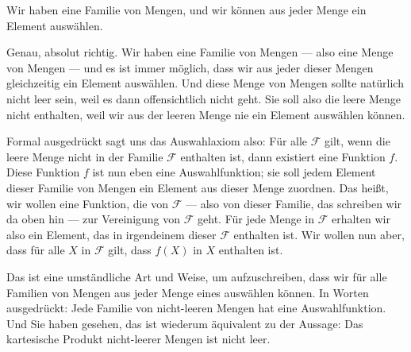 \begin{student-interaction}[Studentenantwort]
Wir haben eine Familie von Mengen, und wir können aus jeder Menge ein Element auswählen.
\end{student-interaction}

\begin{spoken-clean}[00:01:05 - 00:02:40]
Genau, absolut richtig. Wir haben eine Familie von Mengen --- also eine Menge von Mengen --- und es ist immer möglich, dass wir aus jeder dieser Mengen gleichzeitig ein Element auswählen. Und diese Menge von Mengen sollte natürlich nicht leer sein, weil es dann offensichtlich nicht geht. Sie soll also die leere Menge nicht enthalten, weil wir aus der leeren Menge nie ein Element auswählen können.

Formal ausgedrückt sagt uns das Auswahlaxiom also: Für alle $\mathcal{F}$ gilt, wenn die leere Menge nicht in der Familie $\mathcal{F}$ enthalten ist, dann existiert eine Funktion $f$. Diese Funktion $f$ ist nun eben eine Auswahlfunktion; sie soll jedem Element dieser Familie von Mengen ein Element aus dieser Menge zuordnen. Das heißt, wir wollen eine Funktion, die von $\mathcal{F}$ --- also von dieser Familie, das schreiben wir da oben hin --- zur Vereinigung von $\mathcal{F}$ geht. Für jede Menge in $\mathcal{F}$ erhalten wir also ein Element, das in irgendeinem dieser $\mathcal{F}$ enthalten ist. Wir wollen nun aber, dass für alle $X$ in $\mathcal{F}$ gilt, dass $f(X)$ in $X$ enthalten ist.
\end{spoken-clean}

\begin{math-stroke}
\end{math-stroke}

\begin{spoken-clean}[00:02:40 - 00:03:50]
Das ist eine umständliche Art und Weise, um aufzuschreiben, dass wir für alle Familien von Mengen aus jeder Menge eines auswählen können. In Worten ausgedrückt: Jede Familie von nicht-leeren Mengen hat eine Auswahlfunktion. Und Sie haben gesehen, das ist wiederum äquivalent zu der Aussage: Das kartesische Produkt nicht-leerer Mengen ist nicht leer.
\end{spoken-clean}

